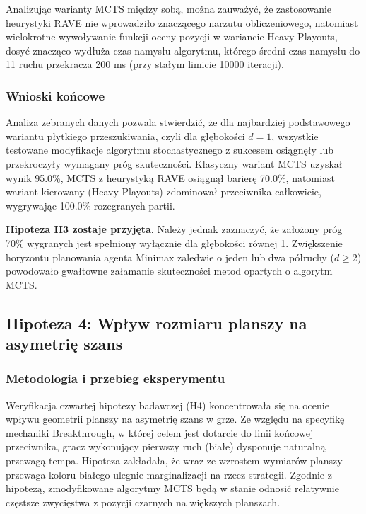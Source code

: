 \documentclass{article}
\begin{document}
Analizując warianty MCTS między sobą, można zauważyć, że zastosowanie heurystyki RAVE nie wprowadziło znaczącego narzutu obliczeniowego, natomiast wielokrotne wywoływanie funkcji oceny pozycji w wariancie Heavy Playouts, dosyć znacząco wydłuża czas namysłu algorytmu, którego średni czas namysłu do 11 ruchu przekracza 200 ms (przy stałym limicie 10000 iteracji).

\subsubsection{Wnioski końcowe}

Analiza zebranych danych pozwala stwierdzić, że dla najbardziej podstawowego wariantu płytkiego przeszukiwania, czyli dla głębokości $d=1$, wszystkie testowane modyfikacje algorytmu stochastycznego z sukcesem osiągnęły lub przekroczyły wymagany próg skuteczności. Klasyczny wariant MCTS uzyskał wynik 95.0\%, MCTS z heurystyką RAVE osiągnął barierę 70.0\%, natomiast wariant kierowany (Heavy Playouts) zdominował przeciwnika całkowicie, wygrywając 100.0\% rozegranych partii.

\textbf{Hipoteza H3 zostaje przyjęta}. Należy jednak zaznaczyć, że założony próg 70\% wygranych jest spełniony wyłącznie dla głębokości równej 1. Zwiększenie horyzontu planowania agenta Minimax zaledwie o jeden lub dwa półruchy ($d \ge 2$) powodowało gwałtowne załamanie skuteczności metod opartych o algorytm MCTS.

\newpage
\subsection{Hipoteza 4: Wpływ rozmiaru planszy na asymetrię szans}

\subsubsection{Metodologia i przebieg eksperymentu}

Weryfikacja czwartej hipotezy badawczej (H4) koncentrowała się na ocenie wpływu geometrii planszy na asymetrię szans w grze. Ze względu na specyfikę mechaniki Breakthrough, w której celem jest dotarcie do linii końcowej przeciwnika, gracz wykonujący pierwszy ruch (białe) dysponuje naturalną przewagą tempa. Hipoteza zakładała, że wraz ze wzrostem wymiarów planszy przewaga koloru białego ulegnie marginalizacji na rzecz strategii. Zgodnie z hipotezą, zmodyfikowane algorytmy MCTS będą w stanie odnosić relatywnie częstsze zwycięstwa z pozycji czarnych na większych planszach.
\end{document}
